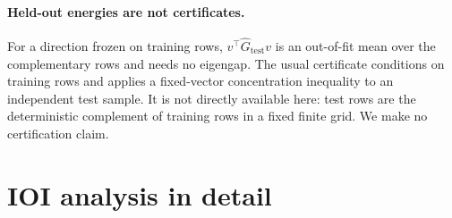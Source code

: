 \paragraph{Held-out energies are not certificates.} For a direction frozen on training rows,
$v^\top\widehat G_{\mathrm{test}}v$ is an out-of-fit mean over the complementary rows and needs no eigengap.
The usual certificate conditions on training rows and applies a fixed-vector concentration inequality to an
independent test sample. It is not directly available here: test rows are the deterministic complement of training
rows in a fixed finite grid. We make no certification claim.

\section{IOI analysis in detail}
\label{app:ioi}

